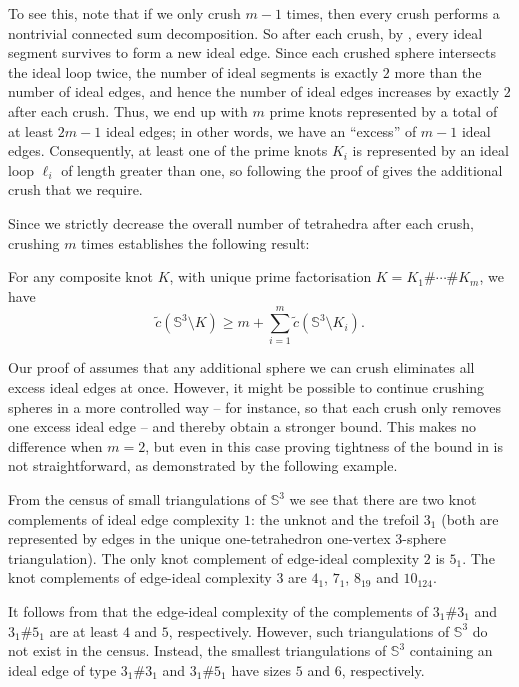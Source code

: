 \documentclass[a4paper,UKenglish,cleveref, autoref, thm-restate]{lipics-v2021}
\begin{document}
To see this, note that if we only crush $m-1$ times, then every crush performs a nontrivial connected sum decomposition.
So after each crush, by , every ideal segment survives to form a new ideal edge.
Since each crushed sphere intersects the ideal loop twice, the number of ideal segments is exactly $2$ more than the number of ideal edges, and hence the number of ideal edges increases by exactly $2$ after each crush.
Thus, we end up with $m$ prime knots represented by a total of at least $2m-1$ ideal edges;
in other words, we have an ``excess'' of $m-1$ ideal edges.
Consequently, at least one of the prime knots $K_i$ is represented by an ideal loop $\ell_i$ of length greater than one,
so following the proof of  gives the additional crush that we require.

Since we strictly decrease the overall number of tetrahedra after each crush, crushing $m$ times establishes the following result:

\begin{proposition}\label{prop:edgeIdealBound}
For any composite knot $K$, with unique prime factorisation $K = K_1 \# \cdots \# K_m$, we have
\[
\tilde{c}(\mathbb{S}^3 \setminus K) \geqslant m + \sum_{i=1}^{m} \tilde{c}(\mathbb{S}^3 \setminus K_i).
\]
\end{proposition}

Our proof of  assumes that any additional sphere we can crush eliminates all excess ideal edges at once.
However, it might be possible to continue crushing spheres in a more controlled way -- for instance, so that each crush only removes one excess ideal edge -- and thereby obtain a stronger bound.
This makes no difference when $m=2$, but even in this case proving tightness of the bound in  is not straightforward, as demonstrated by the following example.

\begin{example}
  \label{appex:bounds}
  From the census of small triangulations of $\mathbb{S}^3$ we see that there are two knot complements of ideal edge complexity $1$: the unknot and the trefoil $3_1$ (both are represented by edges in the unique one-tetrahedron one-vertex $3$-sphere triangulation).
The only knot complement of edge-ideal complexity $2$ is $5_1$.
The knot complements of edge-ideal complexity $3$ are $4_1$, $7_1$, $8_{19}$ and $10_{124}$.

  It follows from  that the edge-ideal complexity of the complements of $3_1 \# 3_1$ and $3_1 \# 5_1$ are at least $4$ and $5$, respectively.
  However, such triangulations of $\mathbb{S}^3$ do not exist in the census.
Instead, the smallest triangulations of $\mathbb{S}^3$ containing an ideal edge of type $3_1 \# 3_1$ and $3_1 \# 5_1$ have sizes $5$ and $6$, respectively.
\end{example}
\end{document}

